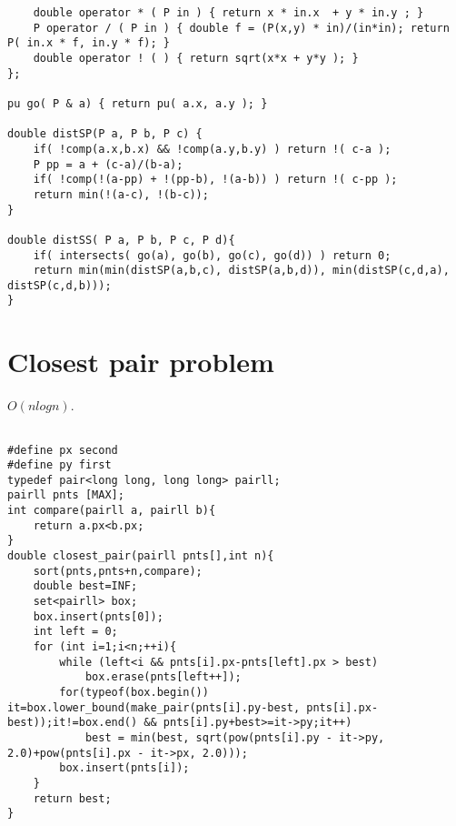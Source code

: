 \begin{multicols}{2}
\begin{lstlisting}
	double operator * ( P in ) { return x * in.x  + y * in.y ; } 
	P operator / ( P in ) { double f = (P(x,y) * in)/(in*in); return P( in.x * f, in.y * f); }
	double operator ! ( ) { return sqrt(x*x + y*y ); }
};

pu go( P & a) { return pu( a.x, a.y ); }

double distSP(P a, P b, P c) {
	if( !comp(a.x,b.x) && !comp(a.y,b.y) ) return !( c-a );
	P pp = a + (c-a)/(b-a); 
	if( !comp(!(a-pp) + !(pp-b), !(a-b)) ) return !( c-pp );
	return min(!(a-c), !(b-c));
}

double distSS( P a, P b, P c, P d){
	if( intersects( go(a), go(b), go(c), go(d)) ) return 0; 
	return min(min(distSP(a,b,c), distSP(a,b,d)), min(distSP(c,d,a), distSP(c,d,b)));
}

	\end{lstlisting}
\end{multicols}

\section{Closest pair problem}
$O(nlogn)$.
\begin{multicols}{2}
	\begin{lstlisting}

#define px second
#define py first
typedef pair<long long, long long> pairll;
pairll pnts [MAX];
int compare(pairll a, pairll b){ 
	return a.px<b.px; 
}
double closest_pair(pairll pnts[],int n){
	sort(pnts,pnts+n,compare);
	double best=INF;
	set<pairll> box;
	box.insert(pnts[0]);
	int left = 0;
	for (int i=1;i<n;++i){
		while (left<i && pnts[i].px-pnts[left].px > best)
			box.erase(pnts[left++]);
		for(typeof(box.begin()) it=box.lower_bound(make_pair(pnts[i].py-best, pnts[i].px-best));it!=box.end() && pnts[i].py+best>=it->py;it++)
			best = min(best, sqrt(pow(pnts[i].py - it->py, 2.0)+pow(pnts[i].px - it->px, 2.0)));
		box.insert(pnts[i]);
	}
	return best;
}

\end{lstlisting}
\end{multicols}

